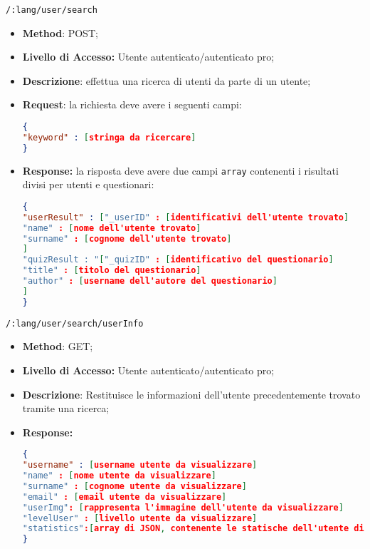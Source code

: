	\item \texttt{/:lang/user/search}
	 \begin{itemize}
	 	\item \textbf{Method}: POST;
	 	\item \textbf{Livello di Accesso:} Utente autenticato/autenticato pro;
	 	\item \textbf{Descrizione}: effettua una ricerca di utenti da parte di un utente;
	 	\item \textbf{Request}: la richiesta deve avere i seguenti campi:
\begin{lstlisting}[language=json,firstnumber=1]
{
"keyword" : [stringa da ricercare]
}
\end{lstlisting} 
		\item \textbf{Response:} la risposta deve avere due campi \texttt{array} contenenti i risultati divisi per utenti e questionari:
\begin{lstlisting}[language=json,firstnumber=1]
{
"userResult" : ["_userID" : [identificativi dell'utente trovato]
"name" : [nome dell'utente trovato]
"surname" : [cognome dell'utente trovato]
]
"quizResult : "["_quizID" : [identificativo del questionario]
"title" : [titolo del questionario]
"author" : [username dell'autore del questionario]
]
}
\end{lstlisting}
	 \end{itemize}
	 
	 
	\item \texttt{/:lang/user/search/userInfo}
	 \begin{itemize}
	 	\item \textbf{Method}: GET;
	 	\item \textbf{Livello di Accesso:} Utente autenticato/autenticato pro;
	 	\item \textbf{Descrizione}: Restituisce le informazioni dell'utente precedentemente trovato tramite una ricerca;
	 	\item \textbf{Response:} 
\begin{lstlisting}[language=json,firstnumber=1]
{
"username" : [username utente da visualizzare]
"name" : [nome utente da visualizzare]
"surname" : [cognome utente da visualizzare]
"email" : [email utente da visualizzare]
"userImg": [rappresenta l'immagine dell'utente da visualizzare]
"levelUser" : [livello utente da visualizzare]
"statistics":[array di JSON, contenente le statische dell'utente di ogni argomento]
}
\end{lstlisting}
	 \end{itemize}
	 
